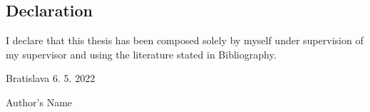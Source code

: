 \null
\vfill
\thispagestyle{empty}

\subsection*{Declaration}

I declare that this thesis has been composed solely by myself under supervision of my supervisor and using the literature stated in Bibliography.
\vspace{10pt}

\noindent Bratislava 6. 5. 2022 \hfil
\newline

\begin{flushright}
	Author's Name $\qquad$
\end{flushright}
\newpage

\